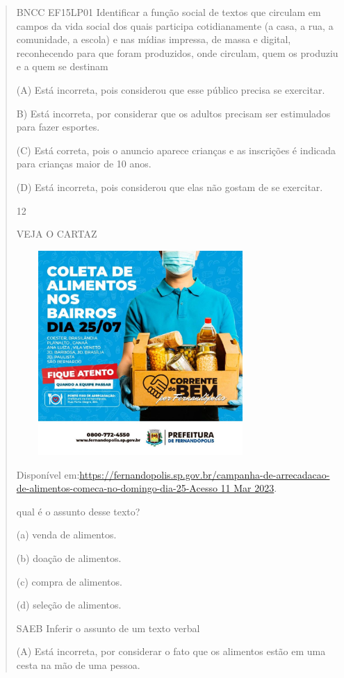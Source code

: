 {{{{\begin{verse}
{{\begin{escolha}
{{{{{BNCC EF15LP01 Identificar a função social de textos que circulam em
campos da vida social dos quais participa cotidianamente (a casa, a rua,
a comunidade, a escola) e nas mídias impressa, de massa e digital,
reconhecendo para que foram produzidos, onde circulam, quem os produziu
e a quem se destinam

(A) Está incorreta, pois considerou que esse público precisa se
exercitar.

B) Está incorreta, por considerar que os adultos precisam ser
estimulados para fazer esportes.

(C) Está correta, pois o anuncio aparece crianças e as inscrições é
indicada para crianças maior de 10 anos.

(D) Está incorreta, pois considerou que elas não gostam de se exercitar.

\num{12}

VEJA O CARTAZ

\includegraphics[width=3.71207in,height=3.06667in]{media/image171.jpeg}

Disponível
em:\href{https://fernandopolis.sp.gov.br/campanha-de-arrecadacao-de-alimentos-comeca-no-domingo-dia-25-Acesso\%2011\%20Mar\%202023}{https://fernandopolis.sp.gov.br/campanha-de-arrecadacao-de-alimentos-comeca-no-domingo-dia-25-Acesso
11 Mar 2023}.

qual é o assunto desse texto?

(a) venda de alimentos.

(b) doação de alimentos.

(c) compra de alimentos.

(d) seleção de alimentos.

SAEB Inferir o assunto de um texto verbal

(A) Está incorreta, por considerar o fato que os alimentos estão em uma
cesta na mão de uma pessoa.

}}}}}
\end{escolha}}}
\end{verse}}}}}
